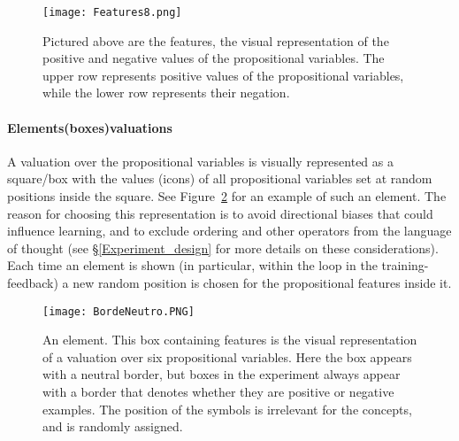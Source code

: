 \begin{figure}[h!]
\begin{center}
    	\texttt{[image: Features8.png]}
	\caption{Pictured above are the features, the visual representation of the positive and negative values of the propositional variables. The upper row represents positive values of the propositional variables, while the lower row represents their negation.}
	 \label{Figure:references}
\end{center}
\end{figure}


\paragraph{Elements(boxes)\textemdash valuations} A valuation over the propositional variables is visually represented as a square/box with the values (icons) of all propositional variables set at random positions inside the square. See Figure~\ref{Figure:element} for an example of such an element. The reason for choosing this representation is to avoid directional biases that could influence learning, and to exclude ordering and other operators from the language of thought (see \S\ref{Experiment_design} for more details on these considerations). %
Each time an element is shown (in particular, within the loop in the training-feedback) a new random position is chosen for the propositional features inside it.
%

\begin{figure}[h!] 
\begin{center}
    	\texttt{[image: BordeNeutro.PNG]}
	\caption{An element. This box containing features is the visual representation of a valuation over six propositional variables. Here the box appears with a neutral border, but boxes in the experiment always appear with a border that denotes whether they are positive or negative examples. The position of the symbols is irrelevant for the concepts, and is randomly assigned.}
	\label{Figure:element} 
\end{center}
\end{figure}


